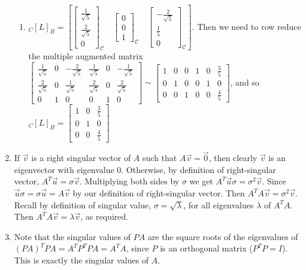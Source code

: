 \documentclass[10pt,english]{article}
\begin{document}
\begin{enumerate}
\begin{enumerate}
        \item $_C[L]_B=\left[\begin{bmatrix}\frac{1}{\sqrt{5}}\\\frac{2}{\sqrt{5}}\\0\end{bmatrix}_\mathcal{C}\quad\begin{bmatrix}0\\0\\1\end{bmatrix}_\mathcal{C}\quad\begin{bmatrix}-\frac{2}{\sqrt{5}}\\\frac{1}{5}\\0\end{bmatrix}_\mathcal{C}\right]$. Then we need to row reduce the multiple augmented matrix $\left[\begin{array}{ccc|ccc}\frac{1}{\sqrt{5}}&0&-\frac{2}{\sqrt{5}}&\frac{1}{\sqrt{5}}&0&-\frac{1}{\sqrt{5}}\\\frac{2}{\sqrt{5}}&0&\frac{1}{\sqrt{5}}&\frac{2}{\sqrt{5}}&0&\frac{2}{\sqrt{5}}\\0&1&0&0&1&0\end{array}\right]\sim\left[\begin{array}{ccc|ccc}1&0&0&1&0&\frac{3}{5}\\0&1&0&0&1&0\\0&0&1&0&0&\frac{4}{5}\end{array}\right]$, and so $_C[L]_B=\begin{bmatrix}1&0&\frac{3}{5}\\0&1&0\\0&0&\frac{4}{5}\end{bmatrix}$
    \end{enumerate}
    
    \pagebreak
    \item If $\vec{v}$ is a right singular vector of $A$ such that $A\vec{v}=\vec{0}$, then clearly $\vec{v}$ is an eigenvector with eigenvalue 0. Otherwise, by definition of right-singular vector, $A^T\vec{u}=\sigma\vec{v}$. Multiplying both sides by $\sigma$ we get $A^T\vec{u}\sigma=\sigma^2\vec{v}$. Since $\vec{u}\sigma=\sigma\vec{u}=A\vec{v}$ by our definition of right-singular vector. Then $A^TA\vec{v}=\sigma^2\vec{v}$. Recall by definition of singular value, $\sigma=\sqrt{\lambda}$, for all eigenvalues $\lambda$ of $A^TA$. Then $A^TA\vec{v}=\lambda\vec{v}$, as required. 
    
    \pagebreak
    \item Note that the singular values of $PA$ are the square roots of the eigenvalues of $(PA)^TPA=A^TP^TPA=A^TA$, since $P$ is an orthogonal matrix ($P^TP=I$). This is exactly the singular values of $A$. 
    
    
\end{enumerate}
\end{document}
